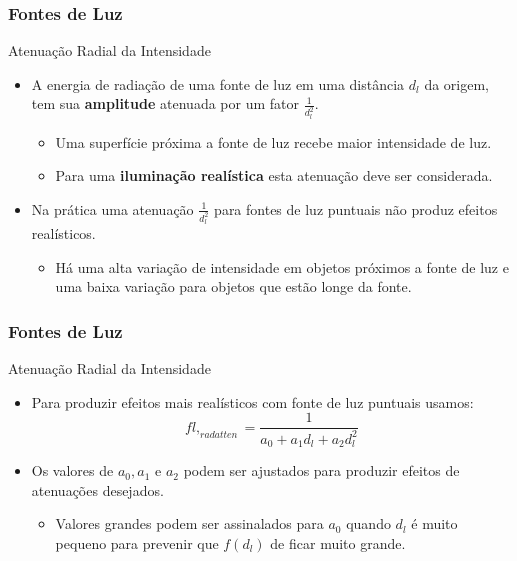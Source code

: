 \documentclass{beamer}
\begin{document}
\begin{frame}
\frametitle{Fontes de Luz}

	\begin{block}{Atenuação Radial da Intensidade}
		\begin{itemize}
			\item A energia de radiação de uma fonte de luz em uma distância $d_l$ da origem, tem sua \textbf{amplitude} atenuada  por um fator $\frac{1}{d^{2}_{l}}$.
			\begin{itemize}
				\item Uma superfície próxima a fonte de luz recebe maior intensidade de luz.
				\item Para uma \textbf{iluminação realística} esta atenuação deve ser considerada.
			\end{itemize}
			\item Na prática uma atenuação $\frac{1}{d^{2}_{l}}$ para fontes de luz puntuais não produz efeitos realísticos.
			\begin{itemize}
				\item Há uma alta variação de intensidade em objetos próximos a fonte de luz e uma baixa variação para objetos que estão longe da fonte.
			\end{itemize}
		\end{itemize}
	\end{block}
\end{frame}

\begin{frame}
\frametitle{Fontes de Luz}

	\begin{block}{Atenuação Radial da Intensidade}
		\begin{itemize}
			\item Para produzir efeitos mais realísticos com fonte de luz puntuais usamos:
				\begin{equation*}
					fl,_{radatten} = \frac{1}{a_0 + a_1d_l + a_2d^{2}_{l}}
				\end{equation*}
			\item Os valores de $a_0,a_1$ e $a_2$ podem ser ajustados para produzir efeitos de atenuações desejados.
			\begin{itemize}
				\item Valores grandes podem ser assinalados para $a_0$ quando $d_l$ é muito pequeno para prevenir que $f(d_l)$ de ficar muito grande.
			\end{itemize}
		\end{itemize}
	\end{block}
\end{frame}
\end{document}
